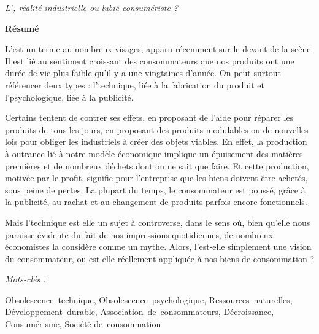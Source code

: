 \pagestyle{empty}

\begin{center}
\begin{LARGE}
\textit{L'\OP, réalité industrielle ou lubie consumériste ? }
\end{LARGE}
\end{center}

\begin{Large}
\textbf{Résumé}
\end{Large}

\vspace{1\baselineskip}

L'\op est un terme au nombreux visages, apparu récemment sur le devant de la scène. Il est lié au sentiment croissant des consommateurs que nos produits ont une durée de vie plus faible qu'il y a une vingtaines d'année. 
On peut surtout référencer deux types : l'\op technique, liée à la fabrication du produit et l'\op psychologique, liée à la publicité.

Certains tentent de contrer ses effets, en proposant de l'aide pour réparer les produits de tous les jours, en proposant des produits modulables ou de nouvelles lois pour obliger les industriels à créer des objets viables. 
En effet, la production à outrance lié à notre modèle économique implique un épuisement des matières premières et de nombreux déchets dont on ne sait que faire. Et cette production, motivée par le profit, signifie pour l'entreprise que les biens doivent être achetés, sous peine de pertes. La plupart du temps, le consommateur est poussé, grâce à la publicité, au rachat et au changement de produits parfois encore fonctionnels. 

Mais l'\op technique est elle un sujet à controverse, dans le sens où, bien qu'elle nous paraisse évidente du fait de nos impressions quotidiennes, de nombreux économistes la considère comme un mythe. Alors, l'\op est-elle simplement une vision du consommateur, ou est-elle réellement appliquée à nos biens de consommation ?

\vspace{\baselineskip}

\begin{large} \emph{Mots-clés :} \end{large}
Obsolescence~technique, Obsolescence~psychologique, Ressources~naturelles, Développement~durable, Association~de~consommateurs, Décroissance, Consumérisme, Société de~consommation

